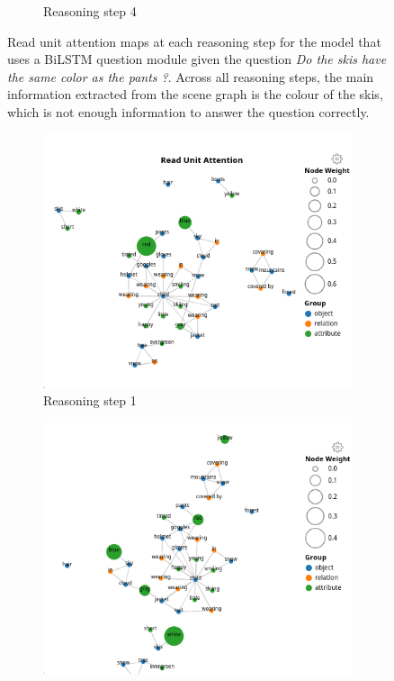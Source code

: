 \begin{figure}[htbp]
\begin{subfigure}[r]{0.4\textwidth}
        \caption{Reasoning step 4}
    \end{subfigure}
    \caption[A collection of BiLSTM question module read unit attemtion maps]{Read unit attention maps at each reasoning step for the model that uses a BiLSTM question module given the question \textit{Do the skis have the same color as the pants ?}. Across all reasoning steps, the main information extracted from the scene graph is the colour of the skis, which is not enough information to answer the question correctly.}
    \label{fig:bilstm_read_attention_maps}
\end{figure}

\begin{figure}[htbp]
    \centering
    \begin{subfigure}[l]{0.4\textwidth}
        \includegraphics[width=\textwidth]{figures/qav/qav_gat_r0.png}
        \caption{Reasoning step 1}
    \end{subfigure}
    \begin{subfigure}[r]{0.4\textwidth}
        \includegraphics[width=\textwidth]{figures/qav/qav_gat_r1.png}

\end{subfigure}
\end{figure}
